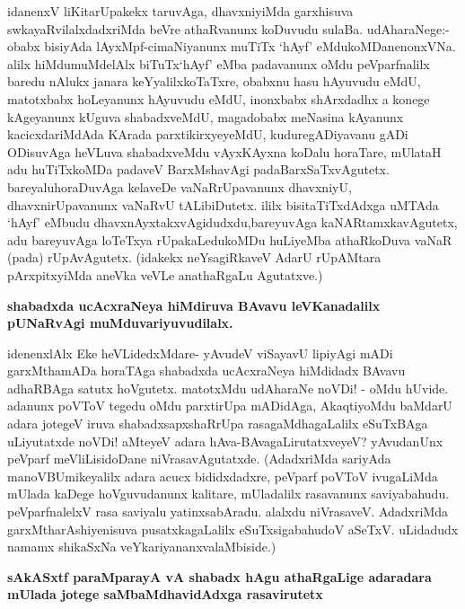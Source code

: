 \noindent
idanenxV liKitarUpakekx taruvAga, dhavxniyiMda garxhisuva swkayaRvilalxdadxriMda beVre athaRvanunx ko\-Duvudu sulaBa. udAharaNege:- obabx bisiyAda lAyxMpf-cimaNi\-yanunx muTiTx `hAyf' eMdu\-koMDa\-nenonxVNa. alilx hiMdumuMdelAlx biTuTx\break `hAyf' eMba padavanunx oMdu peVparfnalilx baredu nAlukx janara keYyalilx\break koTaTxre, obabxnu hasu hAyu\-vudu eMdU, matotxbabx hoLeyanunx hAyu\-vudu eMdU, inonxbabx shArxdadhx a konege kAgeyanunx kUguva shabadxveMdU, maga\-dobabx meNasina kAyanunx kacicxdariMdAda KArada parxtikirxyeyeMdU, kuduregADi\-yavanu gADi ODisuvAga heVLuva shabadxveMdu vAyxKAyxna koDalu horaTare, mUlataH adu huTiTxkoMDa padaveV BarxMshavAgi padaBarxSaTxvAgutetx. bare\-yalu\break horaDu\-vAga kelaveDe vaNaRrUpavanunx dhavxniyU, dhavxnirUpavanunx vaNaRvU tALi\-biDutetx. ililx bisi\-taTiTxdAdxga uMTAda `hAyf' eMbudu dhavxnAyxtakxvAgidudxdu,\break bareyuvAga kaNARtamxkavAgutetx, adu bareyuvAga loTeTxya rUpakaLedukoMDu  huLiyeMba athaRkoDuva vaNaR (pada) rUpAvAgutetx. (idakekx neYsagiRkaveV AdarU rUpAMtara pArxpitxyiMda aneVka veVLe anathaRgaLu Agutatxve.) 

{\bigskip
\noindent
{\large\bf shabadxda ucAcxraNeya hiMdiruva BAvavu leVKanadalilx pUNaRvAgi muMduvariyuvudilalx.}}\label{page181}
\medskip

\noindent
idenenxlAlx Eke heVLidedxMdare- yAvudeV viSayavU lipiyAgi mADi garxMthamADa horaTAga shabadxda ucAcxraNeya hiMdidadx BAvavu adhaRBAga satutx hoVgutetx. matotxMdu udAharaNe noVDi! - oMdu hUvide. adanunx poVToV tegedu oMdu parxtirUpa mADidAga, AkaqtiyoMdu baMdarU adara jotegeV iruva shabadxsapxshaRrUpa rasagaMdhagaLalilx eSuTxBAga uLiyutatxde noVDi! aMteyeV adara hAva-BAvagaLirutatxveyeV? yAvudanUnx peVparf meVliLisidoDane niVrasavAgutatxde. (AdadxriMda sari\-yAda manoVBUmikeyalilx adara acucx bididxdadxre, peVparf poVToV ivugaLiMda mUlada kaDege hoVguvudanunx kalitare, mUladalilx rasavanunx saviyabahudu. peVparfnalelxV rasa saviyalu yatinxsa\-bAradu. alalxdu niVrasaveV. AdadxriMda garxMtharAshiyenisuva pusatxkagaLalilx eSuTxsigabahudoV aSeTxV. uLi\-dadudx namamx shikaSxNa veYkariyananxvalaMbiside.)

{\bigskip
\noindent
{\large\bf sAkASxtf paraMparayA vA shabadx hAgu athaRgaLige adaradara mUlada jotege saMbaMdhavidAdxga rasavirutetx}}\label{page181}
\medskip


